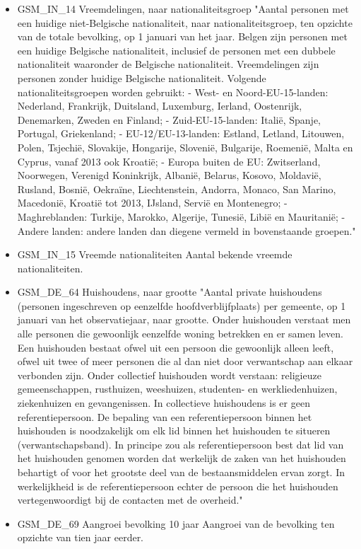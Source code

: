\documentclass{SVnote}
\begin{document}
\begin{itemize}
\item GSM\_IN\_14	Vreemdelingen, naar nationaliteitsgroep		"Aantal personen met een huidige niet-Belgische nationaliteit, naar nationaliteitsgroep, ten opzichte van de totale bevolking, op 1 januari van het jaar.
Belgen zijn personen met een huidige Belgische nationaliteit, inclusief de personen met een dubbele nationaliteit waaronder de Belgische nationaliteit. Vreemdelingen zijn personen zonder huidige Belgische nationaliteit.
Volgende nationaliteitsgroepen worden gebruikt:
- West- en Noord-EU-15-landen: Nederland, Frankrijk, Duitsland, Luxemburg, Ierland, Oostenrijk, Denemarken, Zweden en Finland;
- Zuid-EU-15-landen: Italië, Spanje, Portugal, Griekenland;
- EU-12/EU-13-landen: Estland, Letland, Litouwen, Polen, Tsjechië, Slovakije, Hongarije, Slovenië, Bulgarije, Roemenië, Malta en Cyprus, vanaf 2013 ook Kroatië;
- Europa buiten de EU: Zwitserland, Noorwegen, Verenigd Koninkrijk, Albanië, Belarus, Kosovo, Moldavië, Rusland, Bosnië, Oekraïne, Liechtenstein, Andorra, Monaco, San Marino, Macedonië, Kroatië tot 2013, IJsland, Servië en Montenegro;
- Maghreblanden: Turkije, Marokko, Algerije, Tunesië, Libië en Mauritanië;
- Andere landen: andere landen dan diegene vermeld in bovenstaande groepen."
\item GSM\_IN\_15	Vreemde nationaliteiten		Aantal bekende vreemde nationaliteiten.
\item GSM\_DE\_64	Huishoudens, naar grootte		"Aantal private huishoudens (personen ingeschreven op eenzelfde hoofdverblijfplaats) per gemeente, op 1 januari van het observatiejaar, naar grootte. Onder huishouden verstaat men alle personen die gewoonlijk eenzelfde woning betrekken en er samen leven. Een huishouden bestaat ofwel uit een persoon die gewoonlijk alleen leeft, ofwel uit twee of meer personen die al dan niet door verwantschap aan elkaar verbonden zijn.
Onder collectief huishouden wordt verstaan: religieuze gemeenschappen, rusthuizen, weeshuizen, studenten- en werkliedenhuizen, ziekenhuizen en gevangenissen. In collectieve huishoudens is er geen referentiepersoon.
De bepaling van een referentiepersoon binnen het huishouden is noodzakelijk om elk lid binnen het huishouden te situeren (verwantschapsband). In principe zou als referentiepersoon best dat lid van het huishouden genomen worden dat werkelijk de zaken van het huishouden behartigt of voor het grootste deel van de bestaansmiddelen ervan zorgt. In werkelijkheid is de referentiepersoon echter de persoon die het huishouden vertegenwoordigt bij de contacten met de overheid."
\item GSM\_DE\_69	Aangroei bevolking 10 jaar		Aangroei van de bevolking ten opzichte van tien jaar eerder.

\end{itemize}
\end{document}
